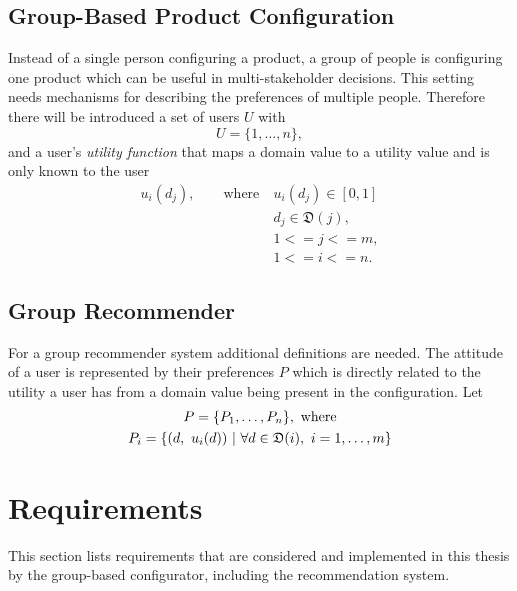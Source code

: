 \subsection{Group-Based Product Configuration}
\label{sec:Foundations:GroupBasedProductConfiguration}

Instead of a single person configuring a product, a group of people is configuring one product which can be useful in multi-stakeholder decisions. This setting needs mechanisms for describing the preferences of multiple people. Therefore there will be introduced a set of users $U$ with
\begin{equation}\label{eq:Foundations:ProductConfiguration:Users}
    U = \{1, \dotsc, n\},
\end{equation}
and a user's \emph{utility function} that maps a domain value to a utility value and is only known to the user
\begin{equation}
    \begin{split}
        u_i(d_j), \qquad \text{where}\ & u_i(d_j) \in [0,1] \\
        & d_j \in  \mathfrak{D}(j),\\
        & 1 <= j <= m, \\
        & 1 <= i <= n.
    \end{split}
\end{equation}

\subsection{Group Recommender}

For a group recommender system additional definitions are needed. The attitude of a user is represented by their preferences $P$ which is directly related to the utility a user has from a domain value being present in the configuration. Let 
\begin{gather} \label{tab:Foundations:GroupRecommenderSystem:Preferences}
    P = \{ P_1, \dotsc, P_n\},\ \text{where} \\
    P_i = \{(d,\ u_i(d)) \ | \ \forall d \in \mathfrak{D}(i),\ i=1,\dotsc,m \} \notag
\end{gather}


\section{Requirements}
\label{sec:Concept:Requirements}

This section lists requirements that are considered and implemented in this thesis by the group-based configurator, including the recommendation system.

